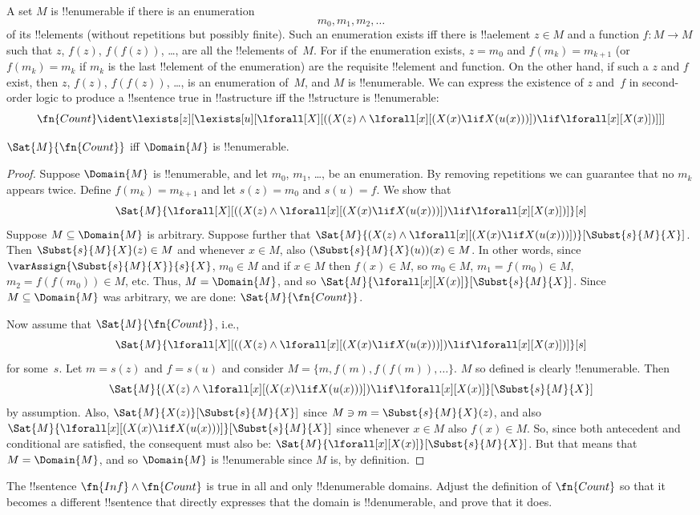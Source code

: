 \documentclass[../../../include/open-logic-section]{subfiles}
\begin{document}
A set $M$ is !!{enumerable} if there is an enumeration
\[
m_0, m_1, m_2, \dots
\]
of its !!{element}s (without repetitions but possibly finite).  Such an enumeration exists
iff there is !!a{element} $z \in M$ and a function $f\colon M \to M$
such that $z$, $f(z)$, $f(f(z))$, \dots, are all the !!{element}s of~$M$. For
if the enumeration exists, $z = m_0$ and $f(m_k) = m_{k+1}$ (or
$f(m_k) = m_k$ if $m_k$ is the last !!{element} of the enumeration)
are the requisite !!{element} and function. On the other hand, if such
a $z$ and $f$ exist, then $z$, $f(z)$, $f(f(z))$, \dots, is an
enumeration of~$M$, and $M$ is !!{enumerable}.  We can express the
existence of $z$ and~$f$ in second-order logic to produce a
!!{sentence} true in !!a{structure} iff the !!{structure} is
!!{enumerable}:
\[
\fn{Count} \ident
\lexists[z][\lexists[u][\lforall[X][((X(z) \land
      \lforall[x][(X(x) \lif X(u(x)))]) \lif \lforall[x][X(x)])]]]
\]

\begin{prop}
$\Sat{M}{\fn{Count}}$ iff $\Domain{M}$ is !!{enumerable}.
\end{prop}

\begin{proof}
Suppose $\Domain{M}$ is !!{enumerable}, and let $m_0$, $m_1$, \dots, be an
enumeration. By removing repetitions we can guarantee that no $m_k$
appears twice. Define $f(m_k) = m_{k+1}$ and let $s(z) = m_0$ and
$s(u) = f$. We show that
\[
\Sat{M}{\lforall[X][((X(z) \land \lforall[x][(X(x) \lif X(u(x)))])
    \lif \lforall[x][X(x)])]}[s]
\]
Suppose $M \subseteq \Domain{M}$ is arbitrary. Suppose further that
$\Sat{M}{(X(z) \land \lforall[x][(X(x) \lif
X(u(x)))])}[\Subst{s}{M}{X}]$. Then $\Subst{s}{M}{X}(z) \in M$ and
whenever $x \in M$, also $(\Subst{s}{M}{X}(u))(x) \in M$. In other
words, since $\varAssign{\Subst{s}{M}{X}}{s}{X}$, $m_0 \in M$ and if
$x \in M$ then $f(x) \in M$, so $m_0 \in M$, $m_1 = f(m_0) \in M$,
$m_2 = f(f(m_0)) \in M$, etc. Thus, $M = \Domain{M}$, and so
$\Sat{M}{\lforall[x][X(x)]}[\Subst{s}{M}{X}]$. Since $M \subseteq
\Domain{M}$ was arbitrary, we are done:
$\Sat{M}{\fn{Count}}$.

Now assume that $\Sat{M}{\fn{Count}}$, i.e., 
\[
\Sat{M}{\lforall[X][((X(z) \land \lforall[x][(X(x) \lif X(u(x)))])
    \lif \lforall[x][X(x)])]}[s]
\]
for some~$s$. Let $m = s(z)$ and $f = s(u)$ and consider $M = \{m,
f(m), f(f(m)), \dots\}$. $M$ so defined is clearly !!{enumerable}.
Then
\[
\Sat{M}{(X(z) \land \lforall[x][(X(x) \lif X(u(x)))])
    \lif \lforall[x][X(x)]}[\Subst{s}{M}{X}]
\]
by assumption. Also, $\Sat{M}{X(z)}[\Subst{s}{M}{X}]$ since $M \ni m =
\Subst{s}{M}{X}(z)$, and also $\Sat{M}{\lforall[x][(X(x) \lif
X(u(x)))]}[\Subst{s}{M}{X}]$ since whenever $x \in M$ also $f(x) \in
M$. So, since both antecedent and conditional are satisfied, the
consequent must also be: $\Sat{M}{\lforall[x][X(x)]}[\Subst{s}{M}{X}]$. But that
means that $M = \Domain{M}$, and so $\Domain{M}$ is !!{enumerable}
since $M$ is, by definition.
\end{proof}

\begin{prob}
The !!{sentence} $\fn{Inf} \land \fn{Count}$ is true in all and only
!!{denumerable} domains.  Adjust the definition of $\fn{Count}$ so
that it becomes a different !!{sentence} that directly expresses that
the domain is !!{denumerable}, and prove that it does.
\end{prob}
\end{document}
